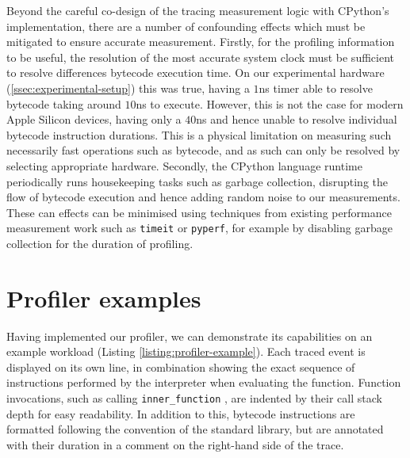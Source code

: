 
Beyond the careful co-design of the tracing measurement logic with CPython's implementation, there are a number of confounding effects which must be mitigated to ensure accurate measurement.
Firstly, for the profiling information to be useful, the resolution of the most accurate system clock must be sufficient to resolve differences bytecode execution time. On our experimental hardware (\autoref{ssec:experimental-setup}) this was true, having a $1$ns timer able to resolve bytecode taking around $10$ns to execute. However, this is not the case for modern Apple Silicon devices, having only a $40$ns and hence unable to resolve individual bytecode instruction durations. This is a physical limitation on measuring such necessarily fast operations such as bytecode, and as such can only be resolved by selecting appropriate hardware.
Secondly, the CPython language runtime periodically runs housekeeping tasks such as garbage collection, disrupting the flow of bytecode execution and hence adding random noise to our measurements. These can effects can be minimised using techniques from existing performance measurement work such as \texttt{timeit} or \texttt{pyperf}, for example by disabling garbage collection for the duration of profiling.





\section{Profiler examples}
\label{sec:profiling-bytecode-examples}

Having implemented our profiler, we can demonstrate its capabilities on an example workload (Listing \ref{listing:profiler-example}).
Each traced event is displayed on its own line, in combination showing the exact sequence of instructions performed by the interpreter when evaluating the function. Function invocations, such as calling \texttt{inner\_function} , are indented by their call stack depth for easy readability. In addition to this, bytecode instructions are formatted following the convention of the standard library, but are annotated with their duration in a comment on the right-hand side of the trace.


